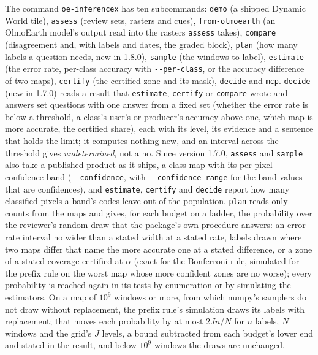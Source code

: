 \documentclass[11pt,a4paper]{article}
\newcommand{\code}[1]{\texttt{#1}}
\begin{document}
The command \code{oe-inferencex} has ten subcommands: \code{demo} (a shipped Dynamic World tile), \code{assess}
(review sets, rasters and cues), \code{from-olmoearth} (an OlmoEarth model's output read into the rasters
\code{assess} takes), \code{compare} (disagreement and, with labels and dates, the graded block),
\code{plan} (how many labels a question needs, new in 1.8.0), \code{sample} (the windows to label), \code{estimate} (the error rate, per-class accuracy with \code{-{}-per-class}, or
the accuracy difference of two maps), \code{certify} (the certified zone and its mask), \code{decide} and \code{mcp}.
\code{decide} (new in 1.7.0) reads a result that \code{estimate}, \code{certify} or \code{compare} wrote and answers set questions
with one answer from a fixed set (whether the error rate is below a threshold, a class's user's or producer's accuracy
above one, which map is more accurate, the certified share), each with its level, its evidence and a sentence that
holds the limit; it computes nothing new, and an interval across the threshold gives \emph{undetermined}, not a no.
Since version 1.7.0, \code{assess} and \code{sample} also take a published product as it ships, a class map with
its per-pixel confidence band (\code{-{}-confidence}, with \code{-{}-confidence-range} for the band values that are
confidences), and \code{estimate}, \code{certify} and \code{decide} report how many classified pixels a band's codes
leave out of the population. \code{plan} reads only counts from the maps and gives, for each budget on a ladder,
the probability over the reviewer's random draw that the package's own procedure answers: an error-rate interval no
wider than a stated width at a stated rate, labels drawn where two maps differ that name the more accurate one at a
stated difference, or a zone of a stated coverage certified at $\alpha$ (exact for the Bonferroni rule, simulated for
the prefix rule on the worst map whose more confident zones are no worse); every probability is reached again in its
tests by enumeration or by simulating the estimators. On a map of $10^9$ windows or more, from which numpy's samplers
do not draw without replacement, the prefix rule's simulation draws its labels with replacement; that moves each
probability by at most $2Jn/N$ for $n$ labels, $N$ windows and the grid's $J$ levels, a bound subtracted from each
budget's lower end and stated in the result, and below $10^9$ windows the draws are unchanged.
\end{document}
